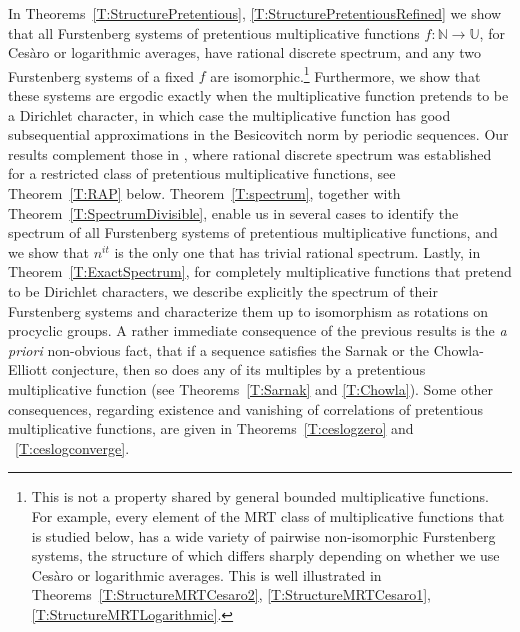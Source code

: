 \documentclass[11pt]{amsart}
\theoremstyle{definition}
\newcommand{\N}{{\mathbb N}}
\newcommand{\U}{{\mathbb U}}
\begin{document}
  In Theorems~\ref{T:StructurePretentious}, \ref{T:StructurePretentiousRefined}  we show that
  all Furstenberg systems of  pretentious multiplicative functions $f\colon \N\to \U$,   for  Ces\`aro or  logarithmic averages, have  rational discrete spectrum, and any two Furstenberg  systems of a fixed $f$ are isomorphic.\footnote{This is not a property shared by general bounded multiplicative functions. For example, every element of  the MRT class of multiplicative functions that is studied below,   has a wide variety of pairwise non-isomorphic Furstenberg systems, the structure of which differs sharply depending on whether we use Ces\`aro or     logarithmic averages. This is well illustrated in  Theorems~\ref{T:StructureMRTCesaro2}, \ref{T:StructureMRTCesaro1}, \ref{T:StructureMRTLogarithmic}.} Furthermore,  we show that these systems
   are  ergodic exactly when
the multiplicative function pretends to be a Dirichlet character, in which   case the multiplicative function has good subsequential approximations in the Besicovitch norm by periodic sequences.
Our results complement those in
\cite{BPLR19,DD82}, where rational discrete spectrum was established for a restricted class of pretentious multiplicative functions, see Theorem~\ref{T:RAP} below.    Theorem~\ref{T:spectrum}, together with Theorem~\ref{T:SpectrumDivisible}, enable us in several cases to identify the spectrum of all Furstenberg systems of  pretentious multiplicative functions, and we show that $n^{it}$ is the only one  that has trivial rational spectrum. Lastly, in Theorem~\ref{T:ExactSpectrum},  for completely multiplicative functions that pretend to be Dirichlet characters,
we describe explicitly the spectrum of their Furstenberg systems and characterize them up to isomorphism as rotations on procyclic groups. A rather immediate consequence of  the previous results is the \textit{a priori} non-obvious fact, that if a sequence satisfies the Sarnak or the Chowla-Elliott conjecture, then so does any of its multiples by a pretentious multiplicative function (see Theorems~\ref{T:Sarnak} and \ref{T:Chowla}). Some other consequences, regarding existence and vanishing of correlations of pretentious multiplicative functions, are given in Theorems~\ref{T:ceslogzero} and ~\ref{T:ceslogconverge}.




\smallskip
\end{document}
